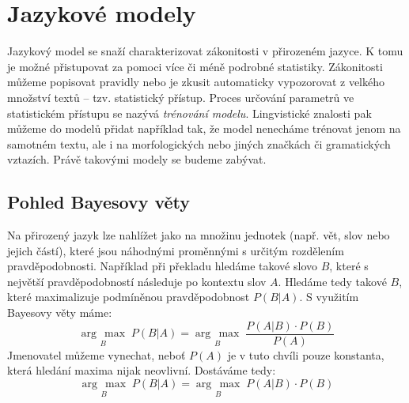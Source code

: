 \documentclass[12pt,a4paper]{report}
\newcommand{\argmax}[1]{\underset{#1}{\operatorname{arg}\,\operatorname{max}}\;}
\begin{document}









\chapter{Jazykové modely}
Jazykový model se snaží charakterizovat zákonitosti v přirozeném jazyce. K tomu je možné přistupovat za pomoci více či méně podrobné statistiky. Zákonitosti můžeme popisovat pravidly nebo je zkusit automaticky vypozorovat z velkého množství textů -- tzv. statistický přístup. Proces určování parametrů ve statistickém přístupu se nazývá \textit{trénování modelu}. Lingvistické znalosti pak můžeme do modelů přidat například tak, že model nenecháme trénovat jenom na samotném textu, ale i na morfologických nebo jiných značkách či gramatických vztazích. Právě takovými modely se budeme zabývat.

\section{Pohled Bayesovy věty}
Na přirozený jazyk lze nahlížet jako na množinu jednotek (např. vět, slov nebo jejich částí), které jsou náhodnými proměnnými s určitým rozdělením pravděpodobnosti. Například při překladu hledáme takové slovo \(B\), které s největší pravděpodobností následuje po kontextu slov \(A\). Hledáme tedy takové \(B\), které maximalizuje podmíněnou pravděpodobnost \(P(B|A)\). S využitím Bayesovy věty máme:
\begin{equation}
\argmax{B} P(B|A) = \argmax{B} \frac{P(A|B) \cdot P(B)}{P(A)} 
\end{equation}
Jmenovatel můžeme vynechat, neboť \(P(A)\) je v tuto chvíli pouze konstanta, která hledání maxima nijak neovlivní. Dostáváme tedy:
\begin{equation}
\argmax{B} P(B|A) = \argmax{B} P(A|B) \cdot P(B)
\end{equation}
\end{document}
